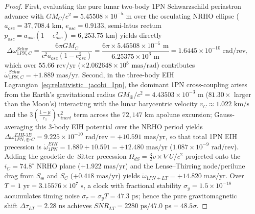 \documentclass[11pt,a4paper,reqno]{article}
\def\bm#1{#1}%
\def\mathrm#1{#1}%
\def\mathbb#1{#1}%
\theoremstyle{plain}
\theoremstyle{definition}
\theoremstyle{remark}
\numberwithin{equation}{section}
\begin{document}
\begin{proof}
First, evaluating the pure lunar two-body 1PN Schwarzschild periastron advance with $G M_{\mathbb{C}} / c^2 = 5.45508 \times 10^{-5}\text{ m}$ over the osculating NRHO ellipse ($a_{\mathrm{osc}} = 37,708.4\text{ km}$, $e_{\mathrm{osc}} = 0.9133$, semi-latus rectum $p_{\mathrm{osc}} = a_{\mathrm{osc}}(1 - e_{\mathrm{osc}}^2) = 6,253.75\text{ km}$) yields directly
\begin{equation*}
  \Delta\omega_{\mathrm{1PN,\mathbb{C}}}^{\mathrm{Schw}} = \frac{6\pi G M_{\mathbb{C}}}{c^2 a_{\mathrm{osc}}(1 - e_{\mathrm{osc}}^2)} = \frac{6\pi \times 5.45508 \times 10^{-5}\text{ m}}{6.25375 \times 10^6\text{ m}} = 1.6445 \times 10^{-10}\text{ rad/rev},
\end{equation*}
which over $55.66\text{ rev/yr}$ ($\times 2.062648 \times 10^8\text{ mas/rad}$) contributes $\dot{\omega}_{\mathrm{1PN,\mathbb{C}}}^{\mathrm{Schw}} = \bm{+1.889\text{ mas/yr}}$. Second, in the three-body EIH Lagrangian~\eqref{eq:relativistic_jacobi_1pn}, the dominant 1PN cross-coupling arises from the Earth's gravitational radius $G M_\oplus / c^2 = 4.43503 \times 10^{-3}\text{ m}$ ($81.30\times$ larger than the Moon's) interacting with the lunar barycentric velocity $v_{\mathbb{C}} \approx 1.022\text{ km/s}$ and the $3\left(\frac{1-\mu}{r_1}\right)v_{\mathrm{inert}}^2$ term across the $72,147\text{ km}$ apolune excursion; Gauss-averaging this 3-body EIH potential over the NRHO period yields $\Delta\omega_{\mathrm{1PN,\oplus\text{-}\mathbb{C}}}^{\mathrm{EIH\text{-}3B}} = 9.225 \times 10^{-10}\text{ rad/rev} = \bm{+10.591\text{ mas/yr}}$, so that total 1PN EIH precession is $\dot{\omega}_{\mathrm{1PN}}^{\mathrm{EIH}} = 1.889 + 10.591 = \bm{+12.480\text{ mas/yr}}$ ($1.087 \times 10^{-9}\text{ rad/rev}$). Adding the geodetic de~Sitter precession $\bm{\Omega}_{\mathrm{dS}} = \frac{3}{2}\bm{v} \times \nabla U / c^2$ projected onto the $i_{\mathbb{C}} = 74.8^\circ$ NRHO plane ($+1.922\text{ mas/yr}$) and the Lense--Thirring node/perilune drag from $\bm{S}_\oplus$ and $\bm{S}_{\mathbb{C}}$ ($+0.418\text{ mas/yr}$) yields $\dot{\omega}_{\mathrm{1PN+LT}} = +14.820\text{ mas/yr}$. Over $T = 1\text{ yr} = 3.15576 \times 10^7\text{ s}$, a clock with fractional stability $\sigma_y = 1.5 \times 10^{-18}$ accumulates timing noise $\sigma_\tau = \sigma_y T = 47.3\text{ ps}$; hence the pure gravitomagnetic shift $\Delta\tau_{\mathrm{LT}} = 2.28\text{ ns}$ achieves $\mathrm{SNR}_{\mathrm{LT}} = 2280\text{ ps} / 47.0\text{ ps} = 48.5\sigma$.
\end{proof}
\end{document}
